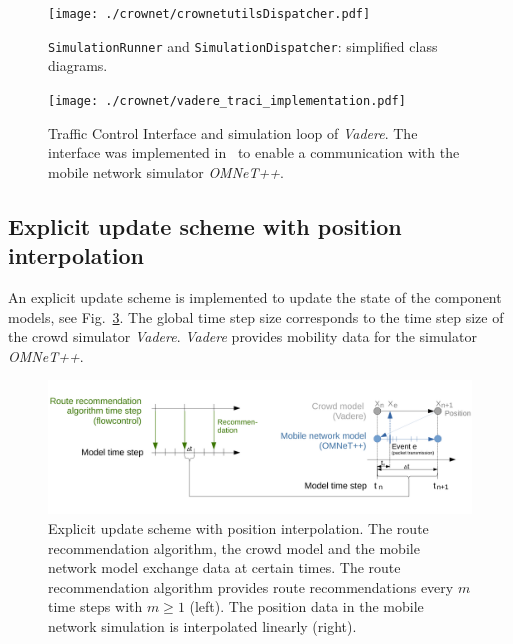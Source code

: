 \begin{figure}[hbt!]
\centering
\texttt{[image: ./crownet/crownetutilsDispatcher.pdf]} 
\caption[SimulationRunner and Dispatcher: simplified class diagramms]{\lstinline{SimulationRunner} and \lstinline{SimulationDispatcher}: simplified class diagrams. }
\label{fig:dispatcher}
\end{figure}





\begin{figure}[H]
\centering
\texttt{[image: ./crownet/vadere\_traci\_implementation.pdf]} 
\caption[Processes in Vadere during coupled simulation]{Traffic Control Interface and simulation loop of \textit{Vadere}. The interface was implemented in~\cite{schuhbaeck-2019-com} to enable a communication with the mobile network simulator \textit{OMNeT++}.}
\label{fig:vaderesequence}
\end{figure}



\FloatBarrier


\subsection{Explicit update scheme with position interpolation}
\label{sec:explicite}
An explicit update scheme is implemented to update the state of the component models, see Fig.~\ref{fig:updateschemecrownet}. The global time step size corresponds to the time step size of the crowd simulator \textit{Vadere}. \textit{Vadere} provides mobility data for the simulator \textit{OMNeT++}.

\begin{figure}[hbt!]
\includegraphics[width=\textwidth]{../figures/crownet/updateapproach.pdf} 
\caption{Explicit update scheme with position interpolation. The route recommendation algorithm, the crowd model and the mobile network model exchange data at certain times. The route recommendation algorithm provides route recommendations every $m$ time steps with $m \geq 1$ (left). The position data in the mobile network simulation is interpolated linearly (right). }
\label{fig:updateschemecrownet}
\end{figure}

